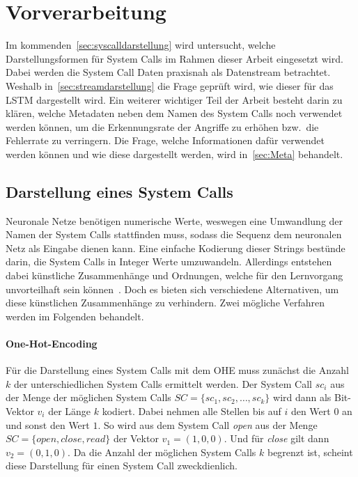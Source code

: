     \section{Vorverarbeitung}\label{sec:Preprocessing}
        Im kommenden~\autoref{sec:syscalldarstellung} wird untersucht, welche Darstellungsformen für System Calls im Rahmen dieser Arbeit eingesetzt wird.
        Dabei werden die System Call Daten praxisnah als Datenstream betrachtet.
        Weshalb in~\autoref{sec:streamdarstellung} die Frage geprüft wird, wie dieser für das \ac{LSTM} dargestellt wird.
        Ein weiterer wichtiger Teil der Arbeit besteht darin zu klären, welche Metadaten neben dem Namen des System Calls noch verwendet werden können, um die Erkennungsrate der Angriffe zu erhöhen bzw.\ die Fehlerrate zu verringern.
        Die Frage, welche Informationen dafür verwendet werden können und wie diese dargestellt werden, wird in~\autoref{sec:Meta} behandelt.

        \subsection{Darstellung eines System Calls}\label{sec:syscalldarstellung}
            Neuronale Netze benötigen numerische Werte, weswegen eine Umwandlung der Namen der System Calls stattfinden muss, sodass die Sequenz dem neuronalen Netz als Eingabe dienen kann. 
            Eine einfache Kodierung dieser Strings bestünde darin, die System Calls in Integer Werte umzuwandeln.
            Allerdings entstehen dabei künstliche Zusammenhänge und Ordnungen, welche für den Lernvorgang unvorteilhaft sein können~\cite{NEURALBISHOP1995}.
            Doch es bieten sich verschiedene Alternativen, um diese künstlichen Zusammenhänge zu verhindern.
            Zwei mögliche Verfahren werden im Folgenden behandelt.

            \paragraph{One-Hot-Encoding}
                Für die Darstellung eines System Calls mit dem \ac{OHE} muss zunächst die Anzahl $k$ der unterschiedlichen System Calls ermittelt werden.
                Der System Call $sc_i$ aus der Menge der möglichen System Calls $ SC = \{sc_1,sc_2,\dots,sc_k\}$ wird dann als Bit-Vektor $v_i$ der Länge $k$ kodiert.
                Dabei nehmen alle Stellen bis auf $i$ den Wert $0$ an und sonst den Wert $1$.
                So wird aus dem System Call \textit{open} aus der Menge $SC = \{open, close, read\}$ der Vektor $v_1 = (1, 0, 0)$.
                Und für \textit{close} gilt dann $v_2 = (0,1,0)$.
                Da die Anzahl der möglichen System Calls $k$ begrenzt ist, scheint diese Darstellung für einen System Call zweckdienlich.\par\medskip

